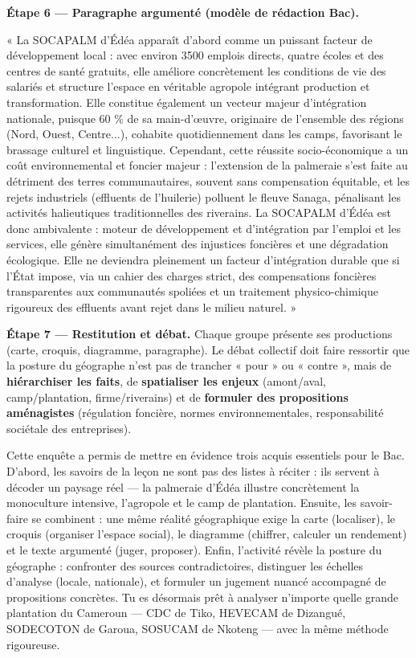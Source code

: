 \documentclass[11pt]{article}
\newcommand{\cle}[1]{{\popxbold\color{popdark}#1}}
\newcounter{popsec}
\newcounter{popsub}
\newcommand{\courssub}[1]{%
  \stepcounter{popsub}%
  \par\vspace{9pt}\noindent{\popxbold\fontsize{11.5}{13}\selectfont\color{popink}{\color{poporange}\thepopsec.\thepopsub}\hspace{6pt}#1}\par\nopagebreak\vspace{4pt}
}
\begin{document}
\begin{exoresolu}
\textbf{Étape 6 — Paragraphe argumenté (modèle de rédaction Bac).}

« La SOCAPALM d'Édéa apparaît d'abord comme un puissant facteur de développement local : avec environ \num{3500} emplois directs, quatre écoles et des centres de santé gratuits, elle améliore concrètement les conditions de vie des salariés et structure l'espace en véritable \cle{agropole} intégrant production et transformation. Elle constitue également un vecteur majeur d'\cle{intégration nationale}, puisque 60 \% de sa main-d'œuvre, originaire de l'ensemble des régions (Nord, Ouest, Centre...), cohabite quotidiennement dans les camps, favorisant le brassage culturel et linguistique. Cependant, cette réussite socio-économique a un coût environnemental et foncier majeur : l'extension de la palmeraie s'est faite au détriment des terres communautaires, souvent sans compensation équitable, et les rejets industriels (effluents de l'huilerie) polluent le fleuve Sanaga, pénalisant les activités halieutiques traditionnelles des riverains. La SOCAPALM d'Édéa est donc ambivalente : moteur de développement et d'intégration par l'emploi et les services, elle génère simultanément des injustices foncières et une dégradation écologique. Elle ne deviendra pleinement un facteur d'intégration durable que si l'État impose, via un cahier des charges strict, des compensations foncières transparentes aux communautés spoliées et un traitement physico-chimique rigoureux des effluents avant rejet dans le milieu naturel. »

\textbf{Étape 7 — Restitution et débat.}
Chaque groupe présente ses productions (carte, croquis, diagramme, paragraphe). Le débat collectif doit faire ressortir que la posture du géographe n'est pas de trancher « pour » ou « contre », mais de \textbf{hiérarchiser les faits}, de \textbf{spatialiser les enjeux} (amont/aval, camp/plantation, firme/riverains) et de \textbf{formuler des propositions aménagistes} (régulation foncière, normes environnementales, responsabilité sociétale des entreprises).

\courssub{Bilan de l'activité}

Cette enquête a permis de mettre en évidence trois acquis essentiels pour le Bac. D'abord, les savoirs de la leçon ne sont pas des listes à réciter : ils servent à décoder un paysage réel — la palmeraie d'Édéa illustre concrètement la \cle{monoculture intensive}, l'\cle{agropole} et le \cle{camp de plantation}. Ensuite, les savoir-faire se combinent : une même réalité géographique exige la carte (localiser), le croquis (organiser l'espace social), le diagramme (chiffrer, calculer un rendement) et le texte argumenté (juger, proposer). Enfin, l'activité révèle la posture du géographe : confronter des sources contradictoires, distinguer les échelles d'analyse (locale, nationale), et formuler un jugement nuancé accompagné de propositions concrètes. Tu es désormais prêt à analyser n'importe quelle grande plantation du Cameroun — \cle{CDC} de Tiko, \cle{HEVECAM} de Dizangué, \cle{SODECOTON} de Garoua, \cle{SOSUCAM} de Nkoteng — avec la même méthode rigoureuse.

\end{exoresolu}
\end{document}
